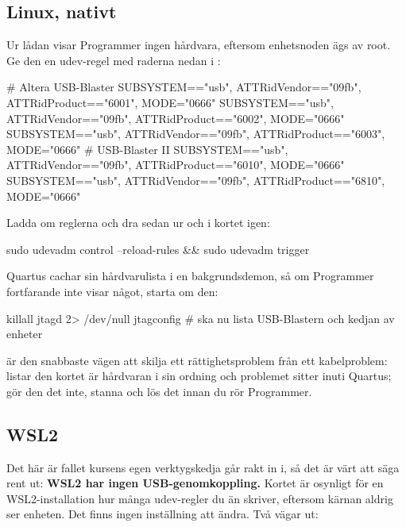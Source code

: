 \subsection*{Linux, nativt}
Ur lådan visar Programmer ingen hårdvara, eftersom enhetsnoden ägs av root. Ge den en udev-regel med
raderna nedan i :

\begin{console}
# Altera USB-Blaster
SUBSYSTEM=="usb", ATTR{idVendor}=="09fb", ATTR{idProduct}=="6001", MODE="0666"
SUBSYSTEM=="usb", ATTR{idVendor}=="09fb", ATTR{idProduct}=="6002", MODE="0666"
SUBSYSTEM=="usb", ATTR{idVendor}=="09fb", ATTR{idProduct}=="6003", MODE="0666"
# USB-Blaster II
SUBSYSTEM=="usb", ATTR{idVendor}=="09fb", ATTR{idProduct}=="6010", MODE="0666"
SUBSYSTEM=="usb", ATTR{idVendor}=="09fb", ATTR{idProduct}=="6810", MODE="0666"
\end{console}

Ladda om reglerna och dra sedan ur och i kortet igen:

\begin{shell}
sudo udevadm control --reload-rules && sudo udevadm trigger
\end{shell}

Quartus cachar sin hårdvarulista i en bakgrundsdemon, så om Programmer fortfarande inte visar något,
starta om den:

\begin{shell}
killall jtagd 2> /dev/null
jtagconfig            # ska nu lista USB-Blastern och kedjan av enheter
\end{shell}

 är den snabbaste vägen att skilja ett rättighetsproblem från ett kabelproblem:
listar den kortet är hårdvaran i sin ordning och problemet sitter inuti Quartus; gör den det inte,
stanna och lös det innan du rör Programmer.

\subsection*{WSL2}
Det här är fallet kursens egen verktygskedja går rakt in i, så det är värt att säga rent ut:
\textbf{WSL2 har ingen USB-genomkoppling.} Kortet är osynligt för en WSL2-installation hur många
udev-regler du än skriver, eftersom kärnan aldrig ser enheten. Det finns ingen inställning att ändra.
Två vägar ut:

